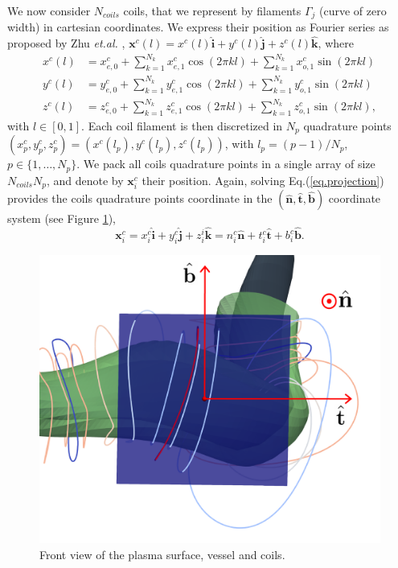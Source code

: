 \documentclass[12pt]{article}
\begin{document}
We now consider $N_{coils}$ coils, that we represent by filaments $\Gamma_j$ (curve of zero width) in cartesian coordinates. We express their position as Fourier series as proposed by Zhu \textit{et.al.} \cite{zhu_2017}, $\mathbf{x}^c(l) = x^c(l)\hat{\mathbf{i}} + y^c(l)\hat{\mathbf{j}} + z^c(l)\hat{\mathbf{k}}$, where
\begin{align}
    x^c(l) &= x^c_{e,0} + \sum_{k=1}^{N_k} x^c_{e,1}\cos(2\pi kl) + \sum_{k=1}^{N_k} x^c_{o,1}\sin(2\pi kl)\\
    y^c(l) &= y^c_{e,0} + \sum_{k=1}^{N_k} y^c_{e,1}\cos(2\pi kl) + \sum_{k=1}^{N_k} y^c_{o,1}\sin(2\pi kl)\\
    z^c(l) &= z^c_{e,0} + \sum_{k=1}^{N_k} z^c_{e,1}\cos(2\pi kl) + \sum_{k=1}^{N_k} z^c_{o,1}\sin(2\pi kl),
\end{align}
with $l\in[0,1]$. Each coil filament is then discretized in $N_p$ quadrature points $(x^c_p,y^c_p,z^c_p)=(x^c(l_p),y^c(l_p),z^c(l_p))$, with $l_p=(p-1)/N_p$, $p\in\{1, \ldots, N_p\}$. We pack all coils quadrature points in a single array of size $N_{coils}N_p$, and denote by $\mathbf{x}^c_i$ their position. Again, solving Eq.(\ref{eq.projection}) provides the coils quadrature points coordinate in the $(\hat{\mathbf{n}},\hat{\mathbf{t}},\hat{\textbf{b}})$ coordinate system (see Figure \ref{fig.coil_projection}),
\begin{equation}
    \mathbf{x}^c_i = x^c_i\hat{\mathbf{i}} + y^c_i\hat{\mathbf{j}} + z^i_i\hat{\mathbf{k}} = n^c_{i}\hat{\mathbf{n}} + t^c_i\hat{\mathbf{t}} + b^c_i\hat{\mathbf{b}}.
\end{equation}
\begin{figure}
    \centering
    \includegraphics[width=\textwidth]{figures/tangent_plane_with_coils.pdf}
    \caption{Front view of the plasma surface, vessel and coils.}
    \label{fig.coil_projection}
\end{figure}
\end{document}
